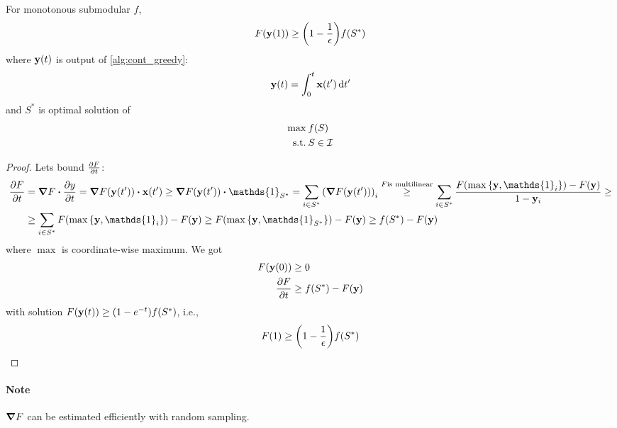 \begin{theorem}
	For monotonous submodular $f$,
	\begin{align}
	F(\vb{y}(1)) \geq \qty(1-\frac{1}{\epsilon})f(S^*)
	\end{align}
	where $\vb{y}(t)$ is output of \vref{alg:cont_greedy}:
	\begin{align}
	\vb{y}(t) = \int_0^t \vb{x}(t') \dd{t'}
	\end{align}
	and $S^*$ is optimal solution of
	\begin{align}
	\max \: & f(S)\\
	\text{s.t.} \: & S\in \mathcal{I}
	\end{align}
	\begin{proof}
		Lets bound $\pdv{F}{t} (\vb{y}(t'))$:
		\begin{align}
		\pdv{F}{t} (\vb{y}(t')) &=  \grad{F} \vdot \pdv{y}{t} =  \grad{F\qty(\vb{y}(t'))} \vdot \vb{x}(t') \geq \grad{F\qty(\vb{y}(t'))} \vdot \mathds{1}_{S^*}= \sum_{i \in S^*} \qty(\grad{F\qty(\vb{y}(t'))})_i \stackrel{F \text{is multilinear}}{\geq} \sum_{i \in S^*} \frac{F\qty(\max\qty{\vb{y}, \mathds{1}_i})-F(\vb{y})}{1-\vb{y}_i} \geq\\&\geq \sum_{i \in S^*} F\qty(\max\qty{\vb{y}, \mathds{1}_i})-F(\vb{y}) \geq F\qty(\max\qty{\vb{y}, \mathds{1}_{S^*}})-F(\vb{y}) \geq f(S^*)-F(\vb{y})
		\end{align}
		where $\max$ is coordinate-wise maximum.
		We got
		\begin{align}
			F(\vb{y}(0)) &\geq 0 \\
			\pdv{F}{t} &\geq f(S^*) - F(\vb{y})
		\end{align}
		with solution $F(\vb{y}(t)) \geq \qty(1-e^{-t}) f(S^*)$, i.e., 
		\begin{align}
		F(1) \geq \qty(1-\frac{1}{\epsilon})f(S^*)
		\end{align}
	\end{proof}
\end{theorem}
\paragraph{Note} $\grad F$ can be estimated efficiently with random sampling.